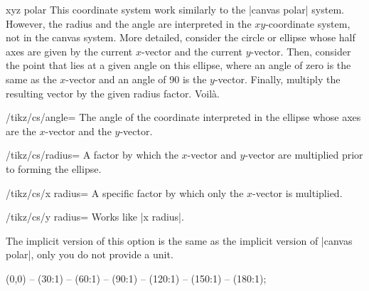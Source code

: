 \begin{coordinatesystem}{xyz polar}
  This coordinate system work similarly to the |canvas polar|
  system. However, the radius and the angle are interpreted in the
  $xy$-coordinate system, not in the canvas system. More detailed,
  consider the circle or ellipse whose half axes are given by the
  current $x$-vector and the current $y$-vector. Then, consider the
  point that lies at a given angle on this ellipse, where an angle of
  zero is the same as the $x$-vector and an angle of 90 is the
  $y$-vector. Finally, multiply the resulting vector by the given
  radius factor. Voil\`a.
  \begin{key}{/tikz/cs/angle=}
    The angle of the coordinate
    interpreted in the ellipse whose axes are the $x$-vector and the
    $y$-vector.
  \end{key}
  \begin{key}{/tikz/cs/radius=}
    A factor by which the $x$-vector
    and $y$-vector are multiplied prior to forming the ellipse.
  \end{key}
  \begin{key}{/tikz/cs/x radius=} A specific factor by
    which only the $x$-vector is multiplied.
  \end{key}
  \begin{key}{/tikz/cs/y radius=}
    Works like |x radius|.
  \end{key}
\begin{codeexample}[]
\end{codeexample}

  The implicit version of this option is the same as the implicit
  version of |canvas polar|, only you do not provide a unit.

\begin{codeexample}[]
\tikz[x={(0cm,1cm)},y={(-1cm,0cm)}]
  \draw  (0,0) -- (30:1) -- (60:1) -- (90:1)
             -- (120:1) -- (150:1) -- (180:1);
\end{codeexample}
\end{coordinatesystem}

